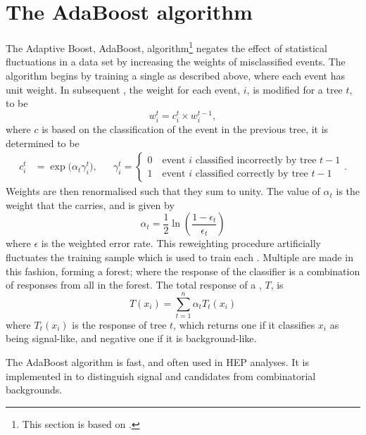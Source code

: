 \section{The AdaBoost algorithm}
\label{sec:bdt:ada}
The Adaptive Boost, AdaBoost, algorithm\footnote{
  This section is based on .} negates the effect of statistical
fluctuations in a data set by increasing the weights of misclassified events.
The algorithm begins by training a single \DT as described above, where each event has unit weight.
In subsequent \DTs, the weight for each event, $i$, is modified for a tree $t$, to be
\begin{equation}
  w_i^t = c_i^t \times w_i^{t-1},
  \label{eq:ada:wt}
\end{equation}
where $c$ is based on the classification of the event in the previous tree, it is determined to be
\begin{align}
  c_i^t &= \exp\big(\alpha_t\gamma_i^t\big),
  &&
  \gamma_i^t=\left\{
    \begin{array}{l}
      0\quad\text{event $i$ classified incorrectly by tree $t-1$} \\
      1\quad\text{event $i$ classified correctly by tree $t-1$}
    \end{array}
  \right..
\end{align}
Weights are then renormalised such that they sum to unity.
The value of $\alpha_t$ is the weight that the \DT carries, and is given by
\begin{equation}
  \alpha_t = \frac12\ln\left(\frac{1-\epsilon_t}{\epsilon_t}\right)
\end{equation}
where $\epsilon$ is the weighted error rate.
This reweighting procedure artificially fluctuates the training sample which is used to train
each \DT.
Multiple \DTs are made in this fashion, forming a forest; where the response of the \BDT classifier
is a combination of responses from all \DTs in the forest.
The total response of a \BDT, $T$, is
\begin{equation}
  T(x_i) = \sum_{t=1}^{n} \alpha_tT_t(x_i)
  \label{eq:ada:fullbdt}
\end{equation}
where $T_t(x_i)$ is the response of tree $t$, which returns one if it classifies $x_i$ as being
signal-like, and negative one if it is background-like.

The AdaBoost algorithm is fast, and often used in \gls{HEP} analyses.
It is implemented in  to distinguish signal \btokpipimumu and \btophikmumu candidates
from combinatorial backgrounds.


